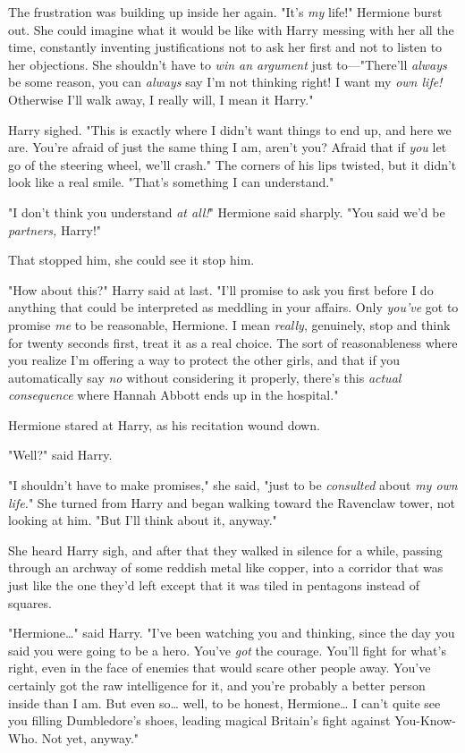 The frustration was building up inside her again. "It's \emph{my} life!"
Hermione burst out. She could imagine what it would be like with Harry messing
with her all the time, constantly inventing justifications not to ask her first
and not to listen to her objections. She shouldn't have to \emph{win an
argument} just to---"There'll \emph{always} be some reason, you can
\emph{always} say I'm not thinking right! I want my \emph{own life!} Otherwise
I'll walk away, I really will, I mean it Harry."

Harry sighed. "This is exactly where I didn't want things to end up, and here
we are. You're afraid of just the same thing I am, aren't you? Afraid that if
\emph{you} let go of the steering wheel, we'll crash." The corners of his lips
twisted, but it didn't look like a real smile. "That's something I can
understand."

"I don't think you understand \emph{at all!}" Hermione said sharply. "You said
we'd be \emph{partners,} Harry!"

That stopped him, she could see it stop him.

"How about this?" Harry said at last. "I'll promise to ask you first before I
do anything that could be interpreted as meddling in your affairs. Only
\emph{you've} got to promise \emph{me} to be reasonable, Hermione. I mean
\emph{really}, genuinely, stop and think for twenty seconds first, treat it as
a real choice. The sort of reasonableness where you realize I'm offering a way
to protect the other girls, and that if you automatically say \emph{no} without
considering it properly, there's this \emph{actual consequence} where Hannah
Abbott ends up in the hospital."

Hermione stared at Harry, as his recitation wound down.

"Well?" said Harry.

"I shouldn't have to make promises," she said, "just to be \emph{consulted}
about \emph{my own life.}" She turned from Harry and began walking toward the
Ravenclaw tower, not looking at him. "But I'll think about it, anyway."

She heard Harry sigh, and after that they walked in silence for a while,
passing through an archway of some reddish metal like copper, into a corridor
that was just like the one they'd left except that it was tiled in pentagons
instead of squares.

"Hermione{\ldots}" said Harry. "I've been watching you and thinking, since the
day you said you were going to be a hero. You've \emph{got} the courage. You'll
fight for what's right, even in the face of enemies that would scare other
people away. You've certainly got the raw intelligence for it, and you're
probably a better person inside than I am. But even so{\ldots} well, to be
honest, Hermione{\ldots} I can't quite see you filling Dumbledore's shoes,
leading magical Britain's fight against You-Know-Who. Not yet, anyway."

